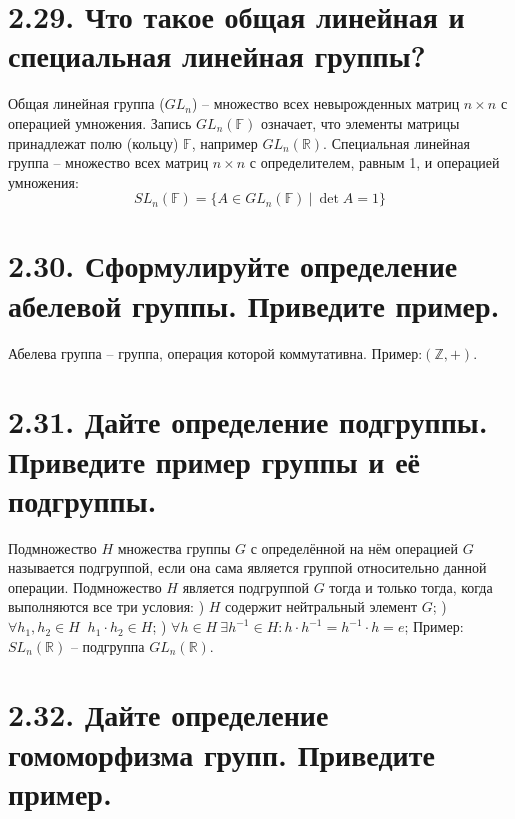\documentclass{article}
\begin{document}
\section*{\LARGE 2.29. Что такое общая линейная и специальная линейная группы?  }

Общая линейная группа ($GL_n$) -- множество всех невырожденных матриц $n \times n$ с операцией умножения. Запись $GL_n(\mathbb{F})$ означает, что элементы матрицы принадлежат полю (кольцу) $\mathbb{F}$, например $GL_n(\mathbb{R})$.
\newline Специальная линейная группа -- множество всех матриц $n \times n$ с определителем, равным 1, и операцией умножения:
$$
SL_n(\mathbb{F}) = \{A \in GL_n(\mathbb{F}) \:|\: \det{A} = 1\}
$$

\section*{\LARGE 2.30. Сформулируйте определение абелевой группы. Приведите пример. }

Абелева группа -- группа, операция которой коммутативна. Пример:$(\mathbb{Z}, +)$.

\section*{\LARGE 2.31. Дайте определение подгруппы. Приведите пример группы и её подгруппы.  }

Подмножество $H$ множества группы $G$ с определённой на нём операцией $G$ называется подгруппой, если она сама является группой относительно данной операции. 
\newline Подмножество $H$ является подгруппой $G$ тогда и только тогда, когда выполняются все три условия:
) $H$ содержит нейтральный элемент $G$;
) $\forall h_1, h_2 \in H \;\; h_1 \cdot h_2 \in H$;
) $\forall h \in H \: \exists h^{-1} \in H : h \cdot h^{-1} = h^{-1} \cdot h = e$;
\newline Пример: $SL_n(\mathbb{R})$ -- подгруппа $GL_n(\mathbb{R})$.

\section*{\LARGE 2.32. Дайте определение гомоморфизма групп. Приведите пример.  }
\end{document}
